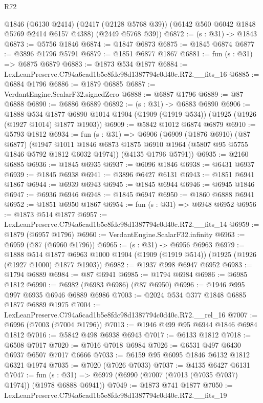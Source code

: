 \begin{lexlean}{R72}
\begin{coremodule}
      @1846
      (@6130 @2414)
      (@2417 (@2128 @5768 @39))
      (@6142 @560 @6042 @1848 @5769 @2414 @6157 @4388)
      (@2449 @5768 @39))
@6872 := (s : @31) -> @1843
@6873 := @5756 @1846
@6874 := @1847 @6873
@6875 := @1845 @6874
@6877 := @3896 @1796 @5791
@6879 := @1851 @6877 @1867
@6881 := fun (s : @31) => @6875 @6879
@6883 := @1873 @534 @1877
@6884 := LexLeanPreserve.C794a6cad1b5e8fdc98d1387794c0d40c.R72.__fits_16
@6885 := @6884 @1796
@6886 := @1879 @6885
@6887 := VerdantEngine.ScalarF32.signedZero
@6888 := @6887 @1796
@6889 := @87 @6888
@6890 := @6886 @6889
@6892 := (s : @31) -> @6883 @6890
@6906 := @1888
    @534
    @1877
    @6890
    @1014
    @1904
    (@1909 (@1919 @534))
    (@1925 (@1926 (@1927 @1014) @1877 @1903))
@6909 := @5842 @1012 @6874 @6879
@6910 := @5793 @1812
@6934 := fun (s : @31) =>
  @6906
    (@6909
      (@1876 @6910)
      (@87 @6877)
      (@1947 @1011 @1846 @6873 @1875 @6910 @1964 (@5807 @95 @5755 @1846 @5792 @1812 @6032 @1974))
      (@4135 @1796 @5791))
@6935 := @2160 @6885
@6936 := @1845 @6935
@6937 := @6096 @1846
@6938 := @6431 @6937
@6939 := @1845 @6938
@6941 := @3896 @6427 @6131
@6943 := @1851 @6941 @1867
@6944 := @6939 @6943
@6945 := @1845 @6944
@6946 := @6945 @1846
@6947 := @6936 @6946
@6948 := @1845 @6947
@6950 := @1860 @6888 @6941
@6952 := @1851 @6950 @1867
@6954 := fun (s : @31) => @6948 @6952
@6956 := @1873 @514 @1877
@6957 := LexLeanPreserve.C794a6cad1b5e8fdc98d1387794c0d40c.R72.__fits_14
@6959 := @1879 (@6957 @1796)
@6960 := VerdantEngine.ScalarF32.infinity
@6963 := @6959 (@87 (@6960 @1796))
@6965 := (s : @31) -> @6956 @6963
@6979 := @1888
    @514
    @1877
    @6963
    @1000
    @1904
    (@1909 (@1919 @514))
    (@1925 (@1926 (@1927 @1000) @1877 @1903))
@6982 := @1937 @998 @6947 @6952
@6983 := @1794 @6889
@6984 := @87 @6941
@6985 := @1794 @6984
@6986 := @6985 @1812
@6990 := @6982 (@6983 @6986) (@87 @6950)
@6996 := @1946 @995 @997 @6935 @6946 @6889 @6986
@7003 := @2024 @534 @377 @1848 @6885 @1877 @6889 @1975
@7004 := LexLeanPreserve.C794a6cad1b5e8fdc98d1387794c0d40c.R72.__rel_16
@7007 := @6996 (@7003 (@7004 @1796))
@7013 := @1946 @499 @95 @6944 @1846 @6984 @1812
@7016 := @5842 @498 @6938 @6943
@7017 := @6133 @1812
@7018 := @6508 @7017
@7020 := @7016 @7018 @6984
@7026 := @6531 @497 @6430 @6937 @6507 @7017 @6666
@7033 := @6159 @95 @6095 @1846 @6132 @1812 @6321 @1974
@7035 := @7020 (@7026 @7033)
@7037 := @4135 @6427 @6131
@7047 := fun (s : @31) => @6979 (@6990 (@7007 (@7013 (@7035 @7037) @1974)) (@1978 @6888 @6941))
@7049 := @1873 @741 @1877
@7050 := LexLeanPreserve.C794a6cad1b5e8fdc98d1387794c0d40c.R72.__fits_19

\end{coremodule}
\end{lexlean}
